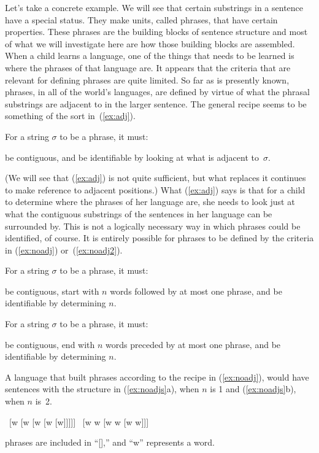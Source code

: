 Let's take a concrete example. We will see that certain substrings in a sentence have a special status. They make units, called phrases, that have certain properties. These phrases are the building blocks of sentence structure and most of what we will investigate here are how those building blocks are assembled. When a child learns a language, one of the things that needs to be learned is where the phrases of that language are. It appears that the criteria that are relevant for defining phrases are quite limited. So far as is presently known, phrases, in all of the world's languages, are defined by virtue of what the phrasal substrings are adjacent to in the larger sentence. The general recipe seems to be something of the sort in~(\ref{ex:adj}).
\begin{exe}
	\raggedright
	\ex \label{ex:adj} 
	For a string $\sigma$ to be a phrase, it must:
	\begin{xlist}
		\ex be contiguous, and
		\ex be identifiable by looking at what is adjacent to~$\sigma$.
	\end{xlist}
\end{exe}
(We will see that (\ref{ex:adj}) is not quite sufficient, but what replaces it continues to make reference to adjacent positions.) What (\ref{ex:adj}) says is that for a child to determine where the phrases of her language are, she needs to look just at what the contiguous substrings of the sentences in her language can be surrounded by. This is not a logically necessary way in which phrases could be identified, of course. It is entirely possible for phrases to be defined by the criteria in (\ref{ex:noadj}) or~(\ref{ex:noadj2}).
\begin{exe}
	\raggedright
	\ex \label{ex:noadj} 
	For a string $\sigma$ to be a phrase, it must:
	\begin{xlist}
		\ex be contiguous, 
		\ex start with $n$ words followed by at most one phrase, and
		\ex be identifiable by determining $n$.
	\end{xlist}
	\ex \label{ex:noadj2}
	For a string $\sigma$ to be a phrase, it must:
	\begin{xlist}
		\ex be contiguous,
		\ex end with $n$ words preceded by at most one phrase, and
		\ex be identifiable by determining $n$.
	\end{xlist}
\end{exe}
A language that built phrases according to the recipe in (\ref{ex:noadj}), would have sentences with the structure in (\ref{ex:noadjs}a), when $n$ is 1 and (\ref{ex:noadjs}b), when $n$ is~2.
\begin{exe}
	\raggedright
	\ex \label{ex:noadjs} 
	\begin{xlist}
		\ex \ [w [w [w [w [w]]]]]
		\ex \ [w w [w w [w w]]]
	\end{xlist}
	\sn phrases are included in ``[],'' and ``w'' represents a word.
\end{exe}

